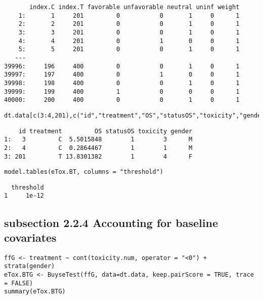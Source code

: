 \documentclass[12pt]{article}
\begin{document}
\begin{verbatim}
       index.C index.T favorable unfavorable neutral uninf weight
    1:       1     201         0           0       1     0      1
    2:       2     201         0           0       1     0      1
    3:       3     201         0           0       1     0      1
    4:       4     201         0           1       0     0      1
    5:       5     201         0           0       1     0      1
   ---                                                           
39996:     196     400         0           0       1     0      1
39997:     197     400         0           1       0     0      1
39998:     198     400         0           0       1     0      1
39999:     199     400         1           0       0     0      1
40000:     200     400         0           0       1     0      1
\end{verbatim}

\lstset{language=r,label= ,caption= ,captionpos=b,numbers=none}
\begin{lstlisting}
dt.data[c(3:4,201),c("id","treatment","OS","statusOS","toxicity","gender")]
\end{lstlisting}

\begin{verbatim}
    id treatment         OS statusOS toxicity gender
1:   3         C  5.5015848        1        3      M
2:   4         C  0.2864467        1        1      M
3: 201         T 13.8301382        1        4      F
\end{verbatim}


\lstset{language=r,label= ,caption= ,captionpos=b,numbers=none}
\begin{lstlisting}
model.tables(eTox.BT, columns = "threshold")
\end{lstlisting}

\begin{verbatim}
  threshold
1     1e-12
\end{verbatim}

\subsection{subsection 2.2.4 Accounting for baseline covariates}
\label{sec:org3540166}

\lstset{language=r,label= ,caption= ,captionpos=b,numbers=none}
\begin{lstlisting}
ffG <- treatment ~ cont(toxicity.num, operator = "<0") + strata(gender)
eTox.BTG <- BuyseTest(ffG, data=dt.data, keep.pairScore = TRUE, trace = FALSE)
summary(eTox.BTG)
\end{lstlisting}
\end{document}
